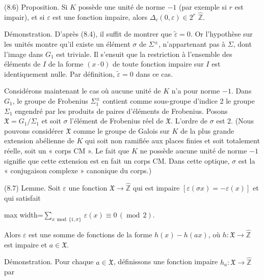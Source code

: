 \documentclass[11pt]{article}
\newcommand{\DFormula}[1]{\par\smallskip\noindent\begin{adjustbox}{max width=\linewidth}$\displaystyle #1$\end{adjustbox}\par\smallskip}
\begin{document}
\par
(8.6) Proposition. Si \(K\) possède une unité de norme \(-1\) (par exemple si \(r\) est impair), et si \(\varepsilon \) est une fonction impaire, alors \(\Delta _{c}(0,\varepsilon )\in 2^{r}\) \(\widehat{\mathbb{Z}}\).\par
\par
Démonstration. D’après (8.4), il suffit de montrer que \(\widetilde{\varepsilon }=0\). Or l’hypothèse sur les unités montre qu’il existe un élément \(\sigma \) de \(\Sigma ^{\pm }\), n’appartenant pas à \(\Sigma \), dont l’image dans \(G_{1}\) est triviale. Il s’ensuit que la restriction à l’ensemble des éléments de \(I\) de la forme \((x\cdot 0)\) de toute fonction impaire sur \(I\) est identiquement nulle. Par définition, \(\widetilde{\varepsilon }=0\) dans ce cas.\par
\par
Considérons maintenant le cas où aucune unité de \(K\) n’a pour norme \(-1\). Dans \(G_{1}\), le groupe de Frobenius \(\Sigma _{1}^{\pm }\) contient comme sous-groupe d’indice 2 le groupe \(\Sigma _{1}\) engendré par les produits de paires d’éléments de Frobenius. Posons \(𝔛=G_{1}/\Sigma _{1}\) et soit \(\sigma \) l’élément de Frobenius réel de \(𝔛\). L’ordre de \(\sigma \) est 2. (Nous pouvons considérer \(𝔛\) comme le groupe de Galois sur \(K\) de la plus grande extension abélienne de \(K\) qui soit non ramifiée aux places finies et soit totalement réelle, soit un « corps CM ». Le fait que \(K\) ne possède aucune unité de norme \(-1\) signifie que cette extension est en fait un corps CM. Dans cette optique, \(\sigma \) est la « conjugaison complexe » canonique du corps.)\par
\par
(8.7) Lemme. Soit \(\varepsilon \) une fonction \(𝔛\to \widehat{\mathbb{Z}}\) qui est impaire \([\varepsilon (\sigma x)=-\varepsilon (x)]\) et qui satisfait\par
\par
\DFormula{\sum _{x\,\operatorname{mod}\,\lbrace 1,\sigma \rbrace }\,\varepsilon (x)\equiv 0\,(\operatorname{mod}\,2).}
\par
Alors \(\varepsilon \) est une somme de fonctions de la forme \(h(x)-h(ax)\), où \(h:𝔛\to \widehat{\mathbb{Z}}\) est impaire et \(a\in 𝔛\).\par
\par
Démonstration. Pour chaque \(a\in 𝔛\), définissons une fonction impaire \(h_{a}:𝔛\to \widehat{\mathbb{Z}}\) par\par
\par
\end{document}
